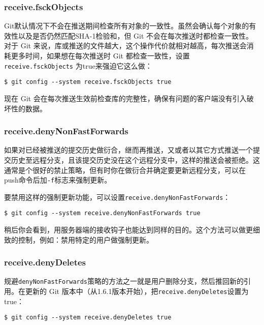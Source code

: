 \documentclass[a4paper]{book}
\begin{document}
\subsubsection{receive.fsckObjects}

Git默认情况下不会在推送期间检查所有对象的一致性。虽然会确认每个对象的有效性以及是否仍然匹配SHA-1检验和，但 Git 不会在每次推送时都检查一致性。对于 Git 来说，库或推送的文件越大，这个操作代价就相对越高，每次推送会消耗更多时间，如果想在每次推送时 Git 都检查一致性，设置 \texttt{receive.fsckObjects} 为true来强迫它这么做：

\begin{shaded}\begin{verbatim}
$ git config --system receive.fsckObjects true
\end{verbatim}\end{shaded}

现在 Git 会在每次推送生效前检查库的完整性，确保有问题的客户端没有引入破坏性的数据。

\subsubsection{receive.denyNonFastForwards}

如果对已经被推送的提交历史做衍合，继而再推送，又或者以其它方式推送一个提交历史至远程分支，且该提交历史没在这个远程分支中，这样的推送会被拒绝。这通常是个很好的禁止策略，但有时你在做衍合并确定要更新远程分支，可以在push命令后加\texttt{-f}标志来强制更新。

要禁用这样的强制更新功能，可以设置\texttt{receive.denyNonFastForwards}：

\begin{shaded}\begin{verbatim}
$ git config --system receive.denyNonFastForwards true
\end{verbatim}\end{shaded}

稍后你会看到，用服务器端的接收钩子也能达到同样的目的。这个方法可以做更细致的控制，例如：禁用特定的用户做强制更新。

\subsubsection{receive.denyDeletes}

规避\texttt{denyNonFastForwards}策略的方法之一就是用户删除分支，然后推回新的引用。在更新的 Git 版本中（从1.6.1版本开始），把\texttt{receive.denyDeletes}设置为true：

\begin{shaded}\begin{verbatim}
$ git config --system receive.denyDeletes true
\end{verbatim}\end{shaded}
\end{document}
